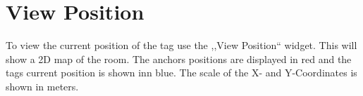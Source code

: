 \chapter{View Position}

To view the current position of the tag use the ,,View Position`` widget. 
This will show a 2D map of the room. The anchors positions are displayed in red and the tags current position is shown inn blue. The scale of the X- and Y-Coordinates is shown in meters. 
